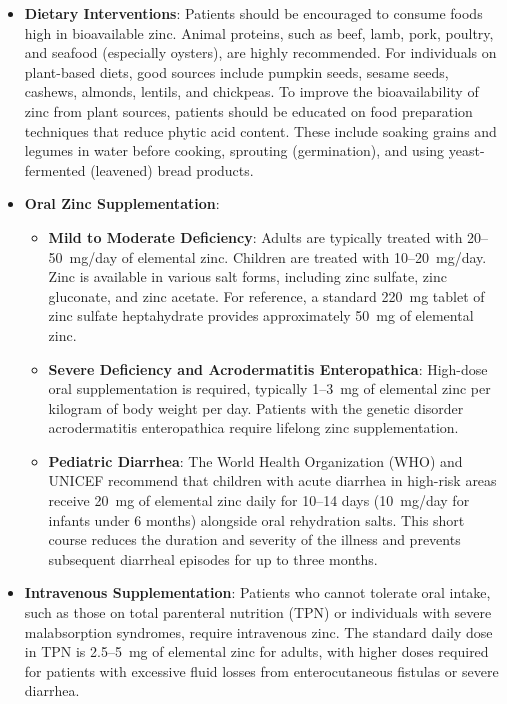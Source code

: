 \begin{itemize}
    \item \textbf{Dietary Interventions}: Patients should be encouraged to consume foods high in bioavailable zinc. Animal proteins, such as beef, lamb, pork, poultry, and seafood (especially oysters), are highly recommended. For individuals on plant-based diets, good sources include pumpkin seeds, sesame seeds, cashews, almonds, lentils, and chickpeas. To improve the bioavailability of zinc from plant sources, patients should be educated on food preparation techniques that reduce phytic acid content. These include soaking grains and legumes in water before cooking, sprouting (germination), and using yeast-fermented (leavened) bread products.
    \item \textbf{Oral Zinc Supplementation}:
        \begin{itemize}
            \item \textbf{Mild to Moderate Deficiency}: Adults are typically treated with 20--50~mg/day of elemental zinc. Children are treated with 10--20~mg/day. Zinc is available in various salt forms, including zinc sulfate, zinc gluconate, and zinc acetate. For reference, a standard 220~mg tablet of zinc sulfate heptahydrate provides approximately 50~mg of elemental zinc.
            \item \textbf{Severe Deficiency and Acrodermatitis Enteropathica}: High-dose oral supplementation is required, typically 1--3~mg of elemental zinc per kilogram of body weight per day. Patients with the genetic disorder acrodermatitis enteropathica require lifelong zinc supplementation.
            \item \textbf{Pediatric Diarrhea}: The World Health Organization (WHO) and UNICEF recommend that children with acute diarrhea in high-risk areas receive 20~mg of elemental zinc daily for 10--14 days (10~mg/day for infants under 6 months) alongside oral rehydration salts. This short course reduces the duration and severity of the illness and prevents subsequent diarrheal episodes for up to three months.
        \end{itemize}
    \item \textbf{Intravenous Supplementation}: Patients who cannot tolerate oral intake, such as those on total parenteral nutrition (TPN) or individuals with severe malabsorption syndromes, require intravenous zinc. The standard daily dose in TPN is 2.5--5~mg of elemental zinc for adults, with higher doses required for patients with excessive fluid losses from enterocutaneous fistulas or severe diarrhea.

\end{itemize}

